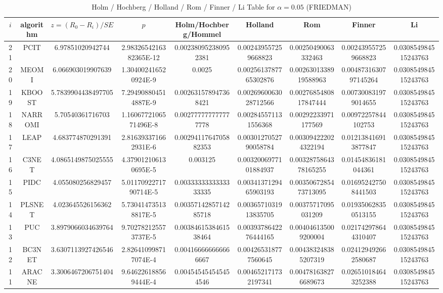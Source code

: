\documentclass[a4paper,10pt]{article}
\begin{document}
\begin{landscape}
\begin{table}[!htp]
\begin{tabular}{
|r|r|r|r|r|r|r|r|r|r|r|r|r|r|r|r|r|r|r|r|r|r|r|}
\end{tabular}
\end{table}

\newpage

\begin{table}[!htp]
\centering\scriptsize
\caption{Holm / Hochberg / Holland / Rom / Finner / Li Table for $\alpha=0.05$ (FRIEDMAN)}
\begin{tabular}{ccccccccc}
$i$&algorithm&$z=(R_0 - R_i)/SE$&$p$&Holm/Hochberg/Hommel&Holland&Rom&Finner&Li\\
\hline
21&PCIT&6.97851020942744&2.9832654216382365E-12&0.002380952380952381&0.002439557259668823&0.00250490063332463&0.002439557259668823&0.030854984515243763\\
20&MEOMI&6.066903019907639&1.304002416520924E-9&0.0025&0.0025613787765302876&0.0026301338919588963&0.0048731630797145264&0.030854984515243763\\
19&KBOOST&5.7839904438497705&7.294908804514887E-9&0.002631578947368421&0.0026960063028712566&0.0027685480817847444&0.007300831979014655&0.030854984515243763\\
18&NARROMI&5.70540361716703&1.1606772106571496E-8&0.002777777777777778&0.002845571131556368&0.00292233971177569&0.00972257844102753&0.030854984515243763\\
17&LEAP&4.683774870291391&2.816393371662931E-6&0.0029411764705882353&0.0030127052790058784&0.003094222024322194&0.012138416913877847&0.030854984515243763\\
16&C3NET&4.0865149875025555&4.379012106130695E-5&0.003125&0.0032006977101884937&0.0032875864378165255&0.01454836181044361&0.030854984515243763\\
15&PIDC&4.055080256829457&5.0117092271790714E-5&0.0033333333333333335&0.0034137129465903193&0.0035067285473713095&0.016952427508441503&0.030854984515243763\\
14&PLSNET&4.023645526156362&5.730414735138817E-5&0.0035714285714285718&0.0036571031913835705&0.00375717095031209&0.019350628350513155&0.030854984515243763\\
13&PUC&3.8979066034639764&9.702782125573737E-5&0.0038461538461538464&0.0039378642276444165&0.004046135009200004&0.021742978644310407&0.030854984515243763\\
12&BC3NET&3.6307113927426546&2.826410998717074E-4&0.004166666666666667&0.004265318777560645&0.004383248385207319&0.024129492662580687&0.030854984515243763\\
11&ARACNE&3.3006467206751404&9.646226188569444E-4&0.004545454545454546&0.004652171732197341&0.004781638276689673&0.026510184643252388&0.030854984515243763\\

\end{tabular}
\end{table}
\end{landscape}
\end{document}

